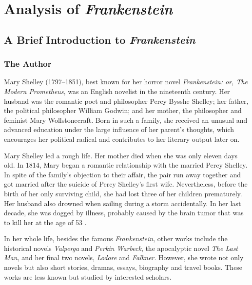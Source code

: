 \chapter{Analysis of \textit{Frankenstein}} %
\label{cha:analysis_of_frankenstein}
\section{A Brief Introduction to \textit{Frankenstein}} %
\label{sec:a_brief_introduction_to_frankenstein}
\subsection{The Author} %
\label{sub:the_author}
\begin{text}

Mary Shelley (1797--1851), best known for her horror novel \textit{Frankenstein: or, The Modern Prometheus}, was an English novelist in the nineteenth century. Her husband was the romantic poet and philosopher Percy Bysshe Shelley; her father, the political philosopher William Godwin; and her mother, the philosopher and feminist Mary Wollstonecraft. Born in such a family, she received an unusual and advanced education under the large influence of her parent's thoughts, which encourages her political radical and contributes to her literary output later on.

Mary Shelley led a rough life. Her mother died when she was only eleven days old. In 1814, Mary began a romantic relationship with the married Percy Shelley. In spite of the family's objection to their affair, the pair run away together and got married after the suicide of Percy Shelley's first wife. Nevertheless, before the birth of her only surviving child, she had lost three of her children prematurely. Her husband also drowned when sailing during a storm accidentally. In her last decade, she was dogged by illness, probably caused by the brain tumor that was to kill her at the age of 53 \citep{wiki:ms}.

In her whole life, besides the famous \textit{Frankenstein}, other works include the historical novels \textit{Valperga} and \textit{Perkin Warbeck}, the apocalyptic novel \textit{The Last Man}, and her final two novels, \textit{Lodore} and \textit{Falkner}. However, she wrote not only novels but also short stories, dramas, essays, biography and travel books. These works are less known but studied by interested scholars.

\end{text}
